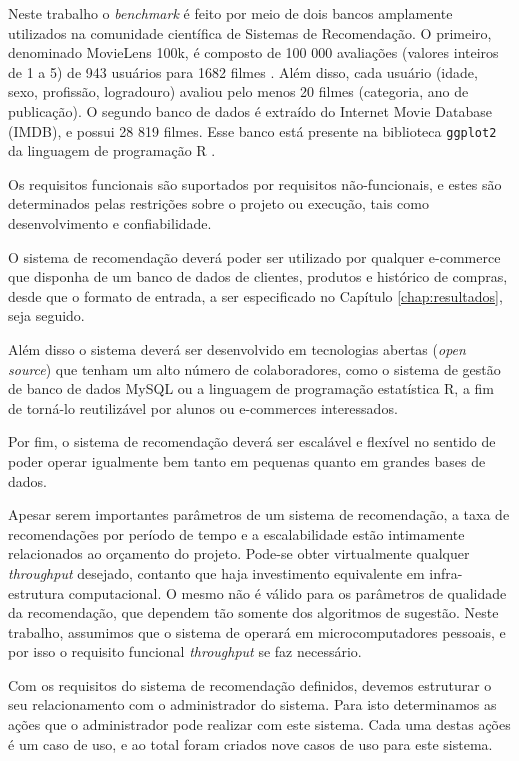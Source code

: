 Neste trabalho o \textit{benchmark} é feito por meio de dois bancos amplamente utilizados na comunidade científica de Sistemas de Recomendação. O primeiro, denominado MovieLens 100k, é composto de 100 000 avaliações (valores inteiros de 1 a 5) de 943 usuários para 1682 filmes \cite{movielensdataset}. Além disso, cada usuário (idade, sexo, profissão, logradouro) avaliou pelo menos 20 filmes (categoria, ano de publicação). O segundo banco de dados é extraído do Internet Movie Database (IMDB), e possui 28 819 filmes. Esse banco está presente na biblioteca \texttt{ggplot2} da linguagem de programação R \cite{moviesggplot2dataset}.  

Os requisitos funcionais são suportados por requisitos não-funcionais, e estes são determinados pelas restrições sobre o projeto ou execução, tais como desenvolvimento e confiabilidade.

O sistema de recomendação deverá poder ser utilizado por qualquer e-commerce que disponha de um banco de dados de clientes, produtos e histórico de compras, desde que o formato de entrada, a ser especificado no Capítulo \ref{chap:resultados}, seja seguido.

Além disso o sistema deverá ser desenvolvido em tecnologias abertas (\textit{open source}) que tenham um alto número de colaboradores, como o sistema de gestão de banco de dados MySQL ou a linguagem de programação estatística R, a fim de torná-lo reutilizável por alunos ou e-commerces interessados.

Por fim, o sistema de recomendação deverá ser escalável e flexível no sentido de poder operar igualmente bem tanto em pequenas quanto em grandes bases de dados.

Apesar serem importantes parâmetros de um sistema de recomendação, a taxa de recomendações por período de tempo e a escalabilidade estão intimamente relacionados ao orçamento do projeto. Pode-se obter virtualmente qualquer \textit{throughput} desejado, contanto que haja investimento equivalente em infra-estrutura computacional. O mesmo não é válido para os parâmetros de qualidade da recomendação, que dependem tão somente dos algoritmos de sugestão. Neste trabalho, assumimos que o sistema de operará em microcomputadores pessoais, e por isso o requisito funcional \textit{throughput} se faz necessário.

Com os requisitos do sistema de recomendação definidos, devemos estruturar o seu relacionamento com o administrador do sistema. Para isto determinamos as ações que o administrador pode realizar com este sistema. Cada uma destas ações é um caso de uso, e ao total foram criados nove casos de uso para este sistema.

